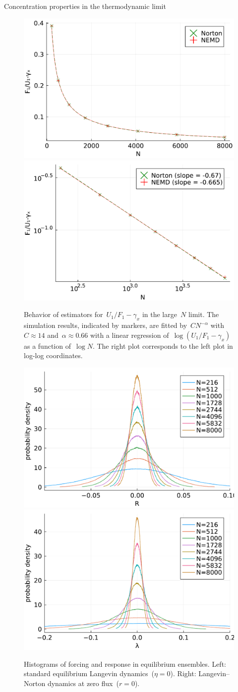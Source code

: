 \begin{subsection}{Concentration properties in the thermodynamic limit}
    \begin{figure}
        \centering
        \includegraphics[width=0.49\linewidth]{figures/04/neq_thermo_limit.pdf}
        \includegraphics[width=0.49\linewidth]{figures/04/neq_thermo_limit_log.pdf}
        \caption[]{Behavior of estimators for~$U_1/F_1-\gamma_x$ in the large~$N$ limit. The simulation results, indicated by markers, are fitted by~$C N^{-\alpha}$ with~$C\approx 14$ and~$\alpha\approx0.66$ with a linear regression of~$\log(U_1/F_1-\gamma_x)$ as a function of~$\log N$. The right plot corresponds to the left plot in log-log coordinates.}
        \label{04:fig:thermo_limit}
    \end{figure}

        \begin{figure}
        \centering
        \includegraphics[width=0.49\linewidth]{figures/04/histograms_eq_thevenin.pdf}
        \includegraphics[width=0.49\linewidth]{figures/04/histograms_eq_norton.pdf}
        \caption[]{Histograms of forcing and response in equilibrium ensembles. Left: standard equilibrium Langevin dynamics~($\eta=0$). Right: Langevin--Norton dynamics at zero flux~($r=0$).}
        \label{04:fig:histograms}
    \end{figure}


\end{subsection}
